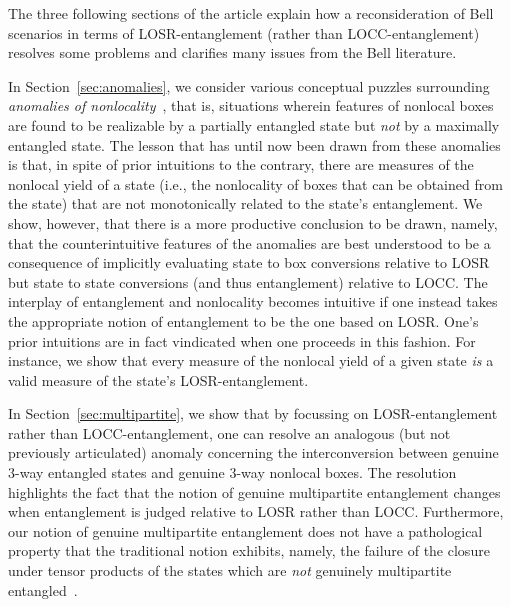 \documentclass[12pt]{article}
\theoremstyle{plain}
\theoremstyle{definition}
\begin{document}
 
 
The three following sections of the article explain how a reconsideration of Bell scenarios in terms of LOSR-entanglement (rather than LOCC-entanglement) resolves some problems and clarifies many issues from the Bell literature.


In Section~\ref{sec:anomalies}, we consider various conceptual puzzles
 surrounding 
  {\em anomalies of nonlocality}~\cite{Methot2006anomaly,AnomalyExtra2005Scarani,AnomalyExtra2008Brunner,vidick2011more,AnomalyExtra2011Junge,Acin2012randomnessvsnonlocality,AnomalyExtra2014Tan,AnomalyExtra2015Augusiak,AnomalyExtra2015Fonseca,AnomalyExtra2016Bowles,AnomalyExtra2017Kabel,AnomalyExtra2018Curchod,AnomalyExtra2018Bamps,AnomalyExtra2018Chitambar,AnomalyExtra2018Lipinska,AnomalyExtra2018Barasinski},
that is, situations wherein features of nonlocal boxes
 are found to be realizable by a partially entangled state but {\em not} by a maximally entangled state.
The lesson that has until now been drawn from these  anomalies is that, in spite of prior intuitions to the contrary, there are measures of the nonlocal yield of a state (i.e., the nonlocality of boxes that can be obtained from the state) that are not monotonically related to the state's entanglement.
We show, however, that there is a more productive conclusion to be drawn, namely, that the counterintuitive features of the anomalies are best understood to be a consequence of implicitly evaluating state to box conversions relative to LOSR but state to state conversions (and thus entanglement) relative to LOCC.  
The interplay of entanglement and nonlocality becomes intuitive if one instead takes the appropriate notion of entanglement to be the one based on LOSR.
One's prior intuitions are in fact vindicated when one proceeds in this fashion.  For instance, we show that
 every measure of the nonlocal yield of a given state {\em is} a valid measure of the state's LOSR-entanglement.

In Section~\ref{sec:multipartite}, we show that by focussing on LOSR-entanglement rather than LOCC-entanglement,
 one can resolve an analogous (but not previously articulated) anomaly concerning the interconversion between genuine 3-way entangled states and genuine 3-way nonlocal boxes. The resolution highlights the fact that the notion of genuine multipartite entanglement changes when entanglement is judged relative to LOSR rather than LOCC. Furthermore, our notion of genuine multipartite entanglement does not have a pathological property that the traditional notion exhibits, namely, the failure of the closure under tensor products of the states which are {\em not} genuinely multipartite entangled~\cite{navascues2020genuine,contreras2021,MultipartiteProblem2020Luo}.
 
\end{document}
